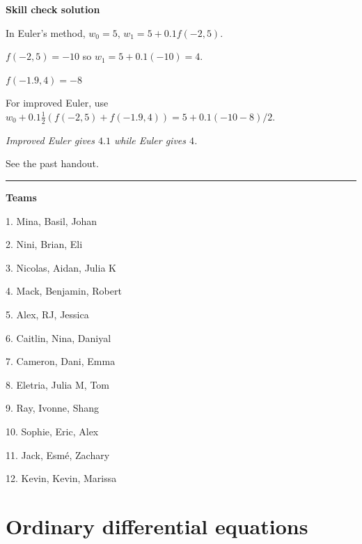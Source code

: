\documentclass[12pt,letterpaper,noanswers]{exam}
\begin{document}
\noindent \textbf{Skill check solution}
\begin{questions}
\item In Euler's method, $w_0 = 5$, $w_1 = 5 + 0.1f(-2,5)$.

$f(-2,5) = -10$ so $w_1 = 5+0.1(-10) = 4$.  

$f(-1.9,4) = -8$

For improved Euler, use $w_0 + 0.1 \frac{1}{2}(f(-2,5) +f(-1.9,4)) = 5+0.1(-10-8)/2$.

\emph{Improved Euler gives $4.1$ while Euler gives $4$.}
\item See the past handout.
\end{questions}
\vspace{0.2cm}
\hrule
\vspace{0.2cm}

\noindent \textbf{Teams}
\begin{multicols}{3}
1. Mina, Basil, Johan

2. Nini, Brian, Eli

3. Nicolas, Aidan, Julia K

4. Mack, Benjamin, Robert

5. Alex, RJ, Jessica

6. Caitlin, Nina, Daniyal

7. Cameron, Dani, Emma

8. Eletria, Julia M, Tom

9. Ray, Ivonne, Shang

10.  Sophie, Eric, Alex

11. Jack, Esmé, Zachary

12. Kevin, Kevin, Marissa

\end{multicols}


\section*{Ordinary differential equations}
\end{document}
